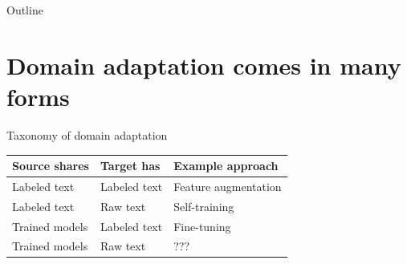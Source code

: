 \documentclass[14pt]{beamer}
\begin{document}
\begin{frame}{Outline}
    \tableofcontents
\end{frame}


\section{Domain adaptation comes in many forms}

\begin{frame}{Taxonomy of domain adaptation}{\cite{laparra:JAMIAOpen:2020}}
\begin{tabular}{ l l l }
\toprule
Source shares & Target has & Example approach \\
\midrule
\pause
Labeled text & Labeled text & Feature augmentation \\
\pause
Labeled text & Raw text & Self-training \\
\pause
Trained models & Labeled text & Fine-tuning \\
\pause
Trained models & Raw text & ??? \\
\bottomrule
\end{tabular}
\end{frame}
\end{document}
